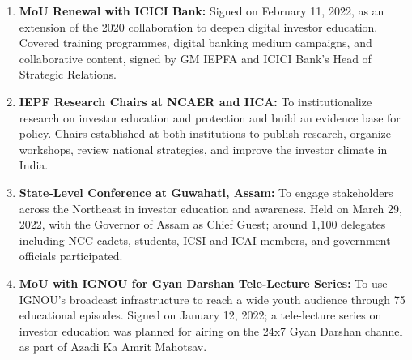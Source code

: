 \documentclass[openany]{book}
\begin{document}
\begin{enumerate}
    \item \textbf{MoU Renewal with ICICI Bank:} Signed on February 11, 2022, as an extension of the 2020 collaboration to deepen digital investor education. Covered training programmes, digital banking medium campaigns, and collaborative content, signed by GM IEPFA and ICICI Bank's Head of Strategic Relations.
    \item \textbf{IEPF Research Chairs at NCAER and IICA:} To institutionalize research on investor education and protection and build an evidence base for policy. Chairs established at both institutions to publish research, organize workshops, review national strategies, and improve the investor climate in India.
    \item \textbf{State-Level Conference at Guwahati, Assam:} To engage stakeholders across the Northeast in investor education and awareness. Held on March 29, 2022, with the Governor of Assam as Chief Guest; around 1,100 delegates including NCC cadets, students, ICSI and ICAI members, and government officials participated.
    \item \textbf{MoU with IGNOU for Gyan Darshan Tele-Lecture Series:} To use IGNOU's broadcast infrastructure to reach a wide youth audience through 75 educational episodes. Signed on January 12, 2022; a tele-lecture series on investor education was planned for airing on the 24x7 Gyan Darshan channel as part of Azadi Ka Amrit Mahotsav.
\end{enumerate}
\end{document}
